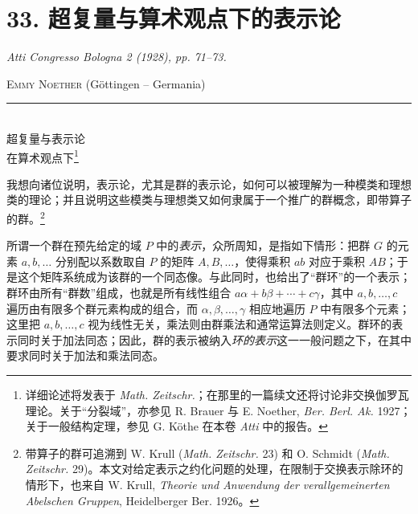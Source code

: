 \setcounter{footnote}{0}

\section*{33. 超复量与算术观点下的表示论}
\emph{Atti Congresso Bologna 2 (1928), pp. 71--73.}

\begingroup
\renewcommand{\thefootnote}{(\arabic{footnote})}

\begin{center}
\textsc{Emmy Noether} (Göttingen -- Germania)\\[-0.1em]
\rule{3em}{0.4pt}\\[0.8em]
\textsc{超复量与表示论}\\
\textsc{在算术观点下}\footnote{详细论述将发表于 \emph{Math. Zeitschr.}；在那里的一篇续文还将讨论非交换伽罗瓦理论。关于“分裂域”，亦参见 R. Brauer 与 E. Noether, \emph{Ber. Berl. Ak.} 1927；关于一般结构定理，参见 G. Köthe 在本卷 \emph{Atti} 中的报告。}
\end{center}

我想向诸位说明，表示论，尤其是群的表示论，如何可以被理解为一种模类和理想类的理论；并且说明这些模类与理想类又如何隶属于一个推广的群概念，即带算子的群。\footnote{带算子的群可追溯到 W. Krull (\emph{Math. Zeitschr.} 23) 和 O. Schmidt (\emph{Math. Zeitschr.} 29)。本文对给定表示之约化问题的处理，在限制于交换表示除环的情形下，也来自 W. Krull, \emph{Theorie und Anwendung der verallgemeinerten Abelschen Gruppen}, Heidelberger Ber. 1926。}

所谓一个群在预先给定的域 $P$ 中的\emph{表示}，众所周知，是指如下情形：把群 $G$ 的元素 $a,b,\ldots$ 分别配以系数取自 $P$ 的矩阵 $A,B,\ldots$，使得乘积 $ab$ 对应于乘积 $AB$；于是这个矩阵系统成为该群的一个同态像。与此同时，也给出了“群环”的一个表示；群环由所有“群数”组成，也就是所有线性组合 $a\alpha+b\beta+\cdots+c\gamma$，其中 $a,b,\ldots,c$ 遍历由有限多个群元素构成的组合，而 $\alpha,\beta,\ldots,\gamma$ 相应地遍历 $P$ 中有限多个元素；这里把 $a,b,\ldots,c$ 视为线性无关，乘法则由群乘法和通常运算法则定义。群环的表示同时关于加法同态；因此，群的表示被纳入\emph{环的表示}这一一般问题之下，在其中要求同时关于加法和乘法同态。

